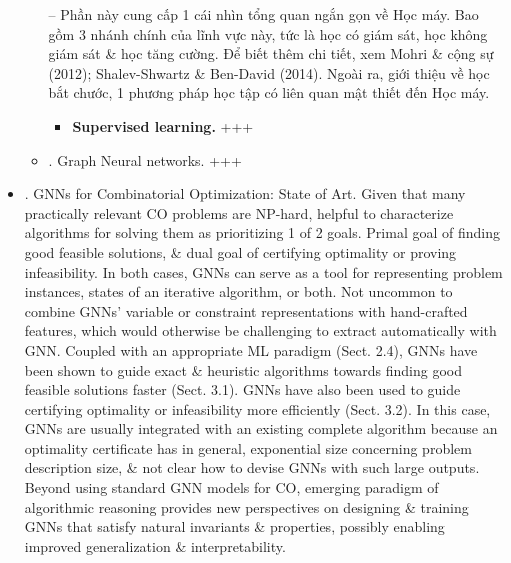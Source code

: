 \documentclass{article}
\begin{document}
\begin{itemize}
\begin{itemize}
        -- Phần này cung cấp 1 cái nhìn tổng quan ngắn gọn về Học máy. Bao gồm 3 nhánh chính của lĩnh vực này, tức là học có giám sát, học không giám sát \& học tăng cường. Để biết thêm chi tiết, xem Mohri \& cộng sự (2012); Shalev-Shwartz \& Ben-David (2014). Ngoài ra, giới thiệu về học bắt chước, 1 phương pháp học tập có liên quan mật thiết đến Học máy.
        \begin{itemize}
            \item {\bf Supervised learning.} +++
        \end{itemize}
        \item {. Graph Neural networks.} +++
    \end{itemize}
    \item {. GNNs for Combinatorial Optimization: State of Art.} Given that many practically relevant CO problems are NP-hard, helpful to characterize algorithms for solving them as prioritizing 1 of 2 goals. Primal goal of finding good feasible solutions, \& dual goal of certifying optimality or proving infeasibility. In both cases, GNNs can serve as a tool for representing problem instances, states of an iterative algorithm, or both. Not uncommon to combine GNNs' variable or constraint representations with hand-crafted features, which would otherwise be challenging to extract automatically with GNN. Coupled with an appropriate ML paradigm (Sect. 2.4), GNNs have been shown to guide exact \& heuristic algorithms towards finding good feasible solutions faster (Sect. 3.1). GNNs have also been used to guide certifying optimality or infeasibility more efficiently (Sect. 3.2). In this case, GNNs are usually integrated with an existing complete algorithm because an optimality certificate has in general, exponential size concerning problem description size, \& not clear how to devise GNNs with such large outputs. Beyond using standard GNN models for CO, emerging paradigm of algorithmic reasoning provides new perspectives on designing \& training GNNs that satisfy natural invariants \& properties, possibly enabling improved generalization \& interpretability.


\end{itemize}
\end{document}
